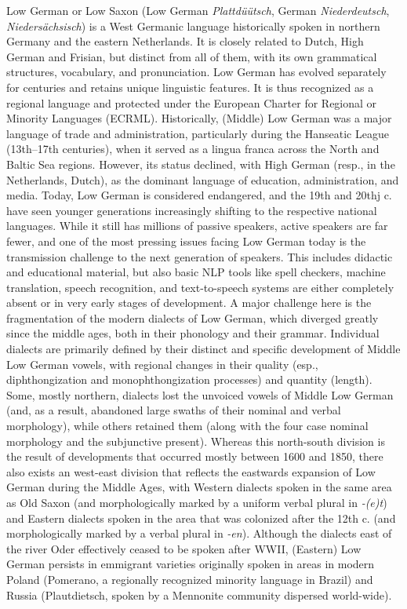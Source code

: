 \documentclass{article}
\newcommand{\word}[1]{\textsl{#1}}
\begin{document}
Low German or Low Saxon (Low German \word{Plattdüütsch}, German \word{Niederdeutsch}, \word{Niedersächsisch}) is a West Germanic language historically spoken in northern Germany and the eastern Netherlands. It is closely related to Dutch, High German and Frisian, but distinct from all of them, with its own grammatical structures, vocabulary, and pronunciation. Low German has evolved separately for centuries and retains unique linguistic features. It is thus recognized as a regional language and protected under the European Charter for Regional or Minority Languages (ECRML). 
Historically, (Middle) Low German was a major language of trade and administration, particularly during the Hanseatic League (13th–17th centuries), when it served as a lingua franca across the North and Baltic Sea regions. However, its status declined, with High German (resp., in the Netherlands, Dutch), as the dominant language of education, administration, and media. Today, Low German is considered endangered, and the 19th and 20thj c. have seen younger generations increasingly shifting to the respective national languages. While it still has millions of passive speakers, active speakers are far fewer, and one of the most pressing issues facing Low German today is the transmission challenge to the next generation of speakers. This includes didactic and educational material, but also basic NLP tools like spell checkers, machine translation, speech recognition, and text-to-speech systems are either completely absent or in very early stages of development. A major challenge here is the fragmentation of the modern dialects of Low German, which diverged greatly since the middle ages, both in their phonology and their grammar. Individual dialects are primarily defined by their distinct and specific development of Middle Low German vowels, with regional changes in their quality (esp., diphthongization and monophthongization processes) and quantity (length). Some, mostly northern, dialects lost the unvoiced vowels of Middle Low German (and, as a result, abandoned large swaths of their nominal and verbal morphology), while others retained them (along with the four case nominal morphology and the subjunctive present). Whereas this north-south division is the result of developments that occurred mostly between 1600 and 1850, there also exists an west-east division that reflects the eastwards expansion of Low German during the Middle Ages, with Western dialects spoken in the same area as Old Saxon (and morphologically marked by a uniform verbal plural in \word{-(e)t}) and Eastern dialects spoken in the area that was colonized after the 12th c. (and morphologically marked by a verbal plural in \word{-en}). Although the dialects east of the river Oder effectively ceased to be spoken after WWII, (Eastern) Low German persists in emmigrant varieties originally spoken in areas in modern Poland (Pomerano, a regionally recognized minority language in Brazil) and Russia (Plautdietsch, spoken by a Mennonite community dispersed world-wide). 
\end{document}
